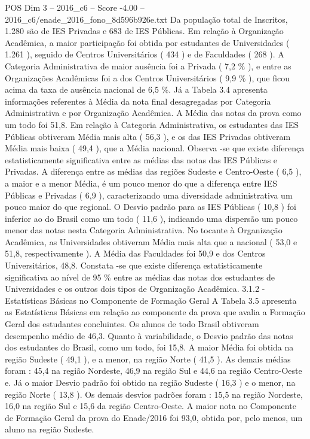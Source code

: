 \begin{textsample}{POS Dim 3 – 2016\_c6 – Score -4.00 – 2016\_c6/enade\_2016\_fono\_8d596b926e.txt}
Da população total de Inscritos, 1.280 são de IES Privadas e 683 de IES Públicas.
Em relação à Organização Acadêmica, a maior participação foi obtida por estudantes de Universidades ( 1.261 ), seguido de Centros Universitários ( 434 ) e de Faculdades ( 268 ).
A Categoria Administrativa de maior ausência foi a Privada ( 7,2 \% ), e entre as Organizações Acadêmicas foi a dos Centros Universitários ( 9,9 \% ), que ficou acima da taxa de ausência nacional de 6,5 \%.
Já a Tabela 3.4 apresenta informações referentes à Média da nota final desagregadas por Categoria Administrativa e por Organização Acadêmica.
A Média das notas da prova como um todo foi 51,8.
Em relação à Categoria Administrativa, os estudantes das IES Públicas obtiveram Média mais alta ( 56,3 ), e os das IES Privadas obtiveram Média mais baixa ( 49,4 ), que a Média nacional.
Observa -se que existe diferença estatisticamente significativa entre as médias das notas das IES Públicas e Privadas.
A diferença entre as médias das regiões Sudeste e Centro-Oeste ( 6,5 ), a maior e a menor Média, é um pouco menor do que a diferença entre IES Públicas e Privadas ( 6,9 ), caracterizando uma diversidade administrativa um pouco maior do que regional.
O Desvio padrão para as IES Públicas ( 10,8 ) foi inferior ao do Brasil como um todo ( 11,6 ), indicando uma dispersão um pouco menor das notas nesta Categoria Administrativa.
No tocante à Organização Acadêmica, as Universidades obtiveram Média mais alta que a nacional ( 53,0 e 51,8, respectivamente ).
A Média das Faculdades foi 50,9 e dos Centros Universitários, 48,8.
Constata -se que existe diferença estatisticamente significativa ao nível de 95 \% entre as médias das notas dos estudantes de Universidades e os outros dois tipos de Organização Acadêmica. 3.1.2 - Estatísticas Básicas no Componente de Formação Geral A Tabela 3.5 apresenta as Estatísticas Básicas em relação ao componente da prova que avalia a Formação Geral dos estudantes concluintes.
Os alunos de todo Brasil obtiveram desempenho médio de 46,3.
Quanto à variabilidade, o Desvio padrão das notas dos estudantes do Brasil, como um todo, foi 15,8.
A maior Média foi obtida na região Sudeste ( 49,1 ), e a menor, na região Norte ( 41,5 ).
As demais médias foram : 45,4 na região Nordeste, 46,9 na região Sul e 44,6 na região Centro-Oeste e.
Já o maior Desvio padrão foi obtido na região Sudeste ( 16,3 ) e o menor, na região Norte ( 13,8 ).
Os demais desvios padrões foram : 15,5 na região Nordeste, 16,0 na região Sul e 15,6 da região Centro-Oeste.
A maior nota no Componente de Formação Geral da prova do Enade/2016 foi 93,0, obtida por, pelo menos, um aluno na região Sudeste.

\end{textsample}

